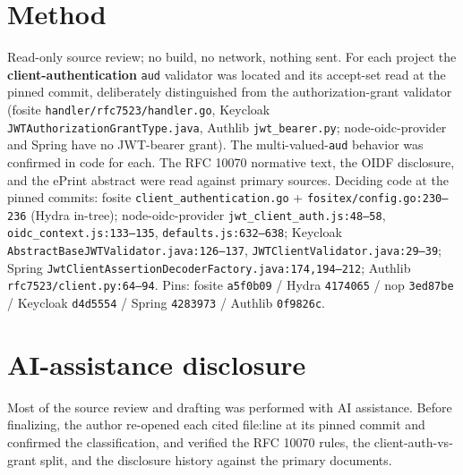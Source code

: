 \documentclass[10pt,twocolumn]{article}
\newcommand{\code}[1]{\texttt{\small #1}}
\begin{document}
\section{Method}
Read-only source review; no build, no network, nothing sent. For each project the
\textbf{client-authentication} \code{aud} validator was located and its accept-set
read at the pinned commit, deliberately distinguished from the authorization-grant
validator (fosite \code{handler/rfc7523/handler.go}, Keycloak
\code{JWTAuthorizationGrantType.java}, Authlib \code{jwt\_bearer.py}; node-oidc-provider
and Spring have no JWT-bearer grant). The multi-valued-\code{aud} behavior was
confirmed in code for each. The RFC 10070 normative text, the OIDF disclosure, and
the ePrint abstract were read against primary sources. Deciding code at the pinned
commits: fosite \code{client\_authentication.go} + \code{fositex/config.go:230--236}
(Hydra in-tree); node-oidc-provider \code{jwt\_client\_auth.js:48--58},
\code{oidc\_context.js:133--135}, \code{defaults.js:632--638}; Keycloak
\code{AbstractBaseJWTValidator.java:126--137}, \code{JWTClientValidator.java:29--39};
Spring \code{JwtClientAssertionDecoderFactory.java:174,194--212}; Authlib
\code{rfc7523/client.py:64--94}. Pins: fosite \code{a5f0b09} / Hydra \code{4174065} /
nop \code{3ed87be} / Keycloak \code{d4d5554} / Spring \code{4283973} / Authlib
\code{0f9826c}.

\section*{AI-assistance disclosure}
Most of the source review and drafting was performed with AI assistance. Before
finalizing, the author re-opened each cited file:line at its pinned commit and
confirmed the classification, and verified the RFC 10070 rules, the
client-auth-vs-grant split, and the disclosure history against the primary
documents.
\end{document}
